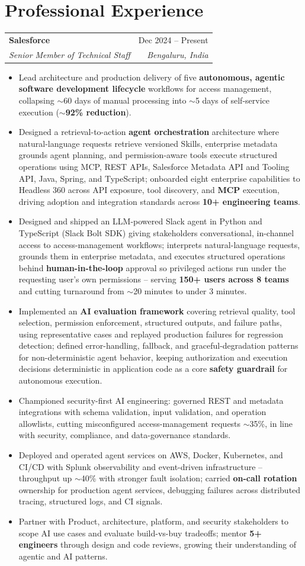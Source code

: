 \documentclass[10.5pt,letterpaper]{article}
\makeatletter
\newcommand{\resumeItem}[1]{\item\small{#1}}
\newcommand{\resumeSubheading}[4]{
  \vspace{4pt}\noindent
  \begin{tabular*}{\textwidth}{l@{\extracolsep{\fill}}r}
    \textbf{#1} & #2 \\
    \textit{\small #3} & \textit{\small #4} \\
  \end{tabular*}\vspace{-2pt}
}
\makeatother
\begin{document}
\section*{Professional Experience}

\resumeSubheading{Salesforce}{Dec 2024 -- Present}{Senior Member of Technical Staff}{Bengaluru, India}
\begin{itemize}
    \resumeItem{Lead architecture and production delivery of five \textbf{autonomous, agentic software development lifecycle} workflows for access management, collapsing $\sim$60 days of manual processing into $\sim$5 days of self-service execution ($\sim$\textbf{92\% reduction}).}
    \resumeItem{Designed a retrieval-to-action \textbf{agent orchestration} architecture where natural-language requests retrieve versioned Skills, enterprise metadata grounds agent planning, and permission-aware tools execute structured operations using MCP, REST APIs, Salesforce Metadata API and Tooling API, Java, Spring, and TypeScript; onboarded eight enterprise capabilities to Headless 360 across API exposure, tool discovery, and \textbf{MCP} execution, driving adoption and integration standards across \textbf{10+ engineering teams}.}
    \resumeItem{Designed and shipped an LLM-powered Slack agent in Python and TypeScript (Slack Bolt SDK) giving stakeholders conversational, in-channel access to access-management workflows; interprets natural-language requests, grounds them in enterprise metadata, and executes structured operations behind \textbf{human-in-the-loop} approval so privileged actions run under the requesting user's own permissions -- serving \textbf{150+ users across 8 teams} and cutting turnaround from $\sim$20 minutes to under 3 minutes.}
    \resumeItem{Implemented an \textbf{AI evaluation framework} covering retrieval quality, tool selection, permission enforcement, structured outputs, and failure paths, using representative cases and replayed production failures for regression detection; defined error-handling, fallback, and graceful-degradation patterns for non-deterministic agent behavior, keeping authorization and execution decisions deterministic in application code as a core \textbf{safety guardrail} for autonomous execution.}
    \resumeItem{Championed security-first AI engineering: governed REST and metadata integrations with schema validation, input validation, and operation allowlists, cutting misconfigured access-management requests $\sim$35\%, in line with security, compliance, and data-governance standards.}
    \resumeItem{Deployed and operated agent services on AWS, Docker, Kubernetes, and CI/CD with Splunk observability and event-driven infrastructure -- throughput up $\sim$40\% with stronger fault isolation; carried \textbf{on-call rotation} ownership for production agent services, debugging failures across distributed tracing, structured logs, and CI signals.}
    \resumeItem{Partner with Product, architecture, platform, and security stakeholders to scope AI use cases and evaluate build-vs-buy tradeoffs; mentor \textbf{5+ engineers} through design and code reviews, growing their understanding of agentic and AI patterns.}
\end{itemize}
\end{document}

